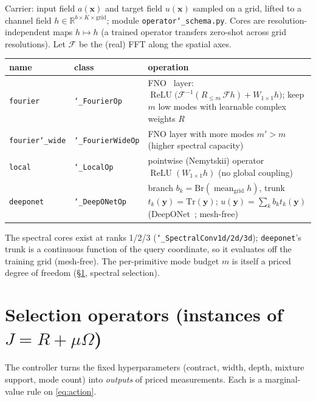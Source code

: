 \documentclass[11pt]{article}
\newcommand{\allowbreakhere}{\discretionary{}{}{}}
\newcommand{\code}[1]{\texttt{\def\_{\char`_\allowbreakhere}#1}}
\newcommand{\R}{\mathbb{R}}
\newcommand{\relu}{\operatorname{ReLU}}
\begin{document}
Carrier: input field $a(\bm x)$ and target field $u(\bm x)$ sampled on a grid, lifted to a channel field
$h\in\R^{b\times K\times\text{grid}}$; module \code{operator\_schema.py}. Cores are
resolution-independent maps $h\mapsto h$ (a trained operator transfers zero-shot across grid resolutions).
Let $\mathcal F$ be the (real) FFT along the spatial axes.

\begin{center}
\footnotesize
\renewcommand{\arraystretch}{1.4}
\begin{tabular}{@{}p{2.0cm}p{2.35cm}p{8.65cm}@{}}
\toprule name & class & operation\\
\midrule
\code{fourier}      & \code{\_FourierOp}     & FNO~\cite{li2021fno} layer: $\relu\big(\mathcal F^{-1}(R_{\le m}\,\mathcal F h)+W_{1{\times}1}h\big)$; keep $m$ low modes with learnable complex weights $R$\\
\code{fourier\_wide}& \code{\_FourierWideOp} & FNO layer with more modes $m'{>}m$ (higher spectral capacity)\\
\code{local}        & \code{\_LocalOp}       & pointwise (Nemytskii) operator $\relu(W_{1{\times}1}h)$ (no global coupling)\\
\code{deeponet}     & \code{\_DeepONetOp}    & branch $b_k=\text{Br}(\operatorname{mean}_{\text{grid}}h)$, trunk $t_k(\bm y)=\text{Tr}(\bm y)$; $u(\bm y)=\sum_k b_k t_k(\bm y)$ (DeepONet~\cite{lu2021deeponet}; mesh-free)\\
\bottomrule
\end{tabular}
\end{center}

\noindent The spectral cores exist at ranks 1/2/3 (\code{\_SpectralConv1d/2d/3d}); \code{deeponet}'s trunk is a
continuous function of the query coordinate, so it evaluates off the training grid (mesh-free). The
per-primitive mode budget $m$ is itself a priced degree of freedom (\S\ref{sec:select}, spectral selection).

\section{Selection operators (instances of \texorpdfstring{$J=R+\mu\Omega$}{J=R+muOmega})}
\label{sec:select}

The controller turns the fixed hyperparameters (contract, width, depth, mixture support, mode count) into
\emph{outputs} of priced measurements. Each is a marginal-value rule on \eqref{eq:action}.
\end{document}
